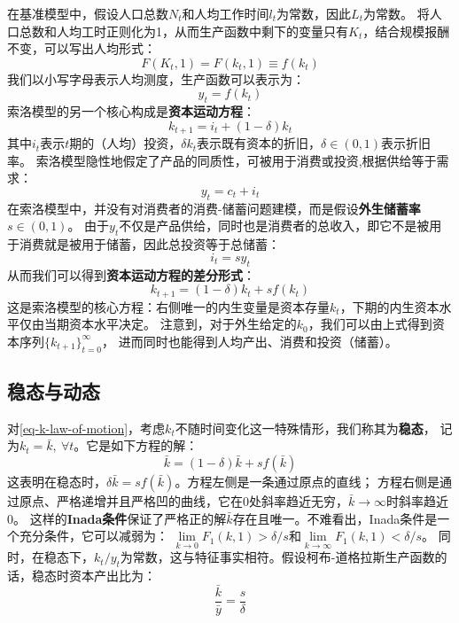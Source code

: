 在基准模型中，假设人口总数$N_t$和人均工作时间$l_t$为常数，因此$L_t$为常数。
将人口总数和人均工时正则化为1，从而生产函数中剩下的变量只有$K_t$，结合规模报酬不变，可以写出人均形式：
\begin{equation*}
    F(K_t, 1)=F(k_t, 1)\equiv f(k_t)
\end{equation*}
我们以小写字母表示人均测度，生产函数可以表示为：
\begin{equation}
    y_t = f(k_t)
\end{equation}
索洛模型的另一个核心构成是\textbf{资本运动方程}：
\begin{equation}    
    k_{t+1} = i_t + (1-\delta)k_t
\end{equation}
其中$i_t$表示$t$期的（人均）投资，$\delta k_t$表示既有资本的折旧，$\delta\in (0,1)$表示折旧率。
索洛模型隐性地假定了产品的同质性，可被用于消费或投资,根据供给等于需求：
\begin{equation}
    y_t = c_t + i_t
\end{equation}
在索洛模型中，并没有对消费者的消费-储蓄问题建模，而是假设\textbf{外生储蓄率}$s\in(0,1)$。
由于$y_t$不仅是产品供给，同时也是消费者的总收入，即它不是被用于消费就是被用于储蓄，因此总投资等于总储蓄：
\begin{equation}
    i_t = s y_t
\end{equation}
从而我们可以得到\textbf{资本运动方程的差分形式}：
\begin{equation}    \label{eq-k-law-of-motion}
    k_{t+1} = (1-\delta)k_t + sf(k_t)
\end{equation}
这是索洛模型的核心方程：右侧唯一的内生变量是资本存量$k_t$，下期的内生资本水平仅由当期资本水平决定。
注意到，对于外生给定的$k_0$，我们可以由上式得到资本序列$\{k_{t+1}\}_{t=0}^{\infty}$，
进而同时也能得到人均产出、消费和投资（储蓄）。


\subsection{稳态与动态}

对\cref{eq-k-law-of-motion}，考虑$k_t$不随时间变化这一特殊情形，我们称其为\textbf{稳态}，
记为$k_t=\bar{k},~\forall t$。它是如下方程的解：
\begin{equation*}
    \bar{k}=(1-\delta) \bar{k}+s f(\bar{k})
\end{equation*}
这表明在稳态时，$\delta \bar{k} = sf(\bar{k})$。方程左侧是一条通过原点的直线；
方程右侧是通过原点、严格递增并且严格凹的曲线，它在0处斜率趋近无穷，$\bar{k}\rightarrow \infty$时斜率趋近0。
这样的\textbf{Inada条件}保证了严格正的解$\bar{k}$存在且唯一。不难看出，Inada条件是一个充分条件，它可以减弱为：
$\lim\limits_{k\rightarrow 0}F_1(k,1)>\delta/s$和$\lim\limits_{k\rightarrow \infty}F_1(k,1)<\delta/s$。
同时，在稳态下，$k_t/y_t$为常数，这与特征事实相符。假设柯布-道格拉斯生产函数的话，稳态时资本产出比为：
\begin{equation*}
    \frac{\bar{k}}{\bar{y}} = \frac{s}{\delta}
\end{equation*}

